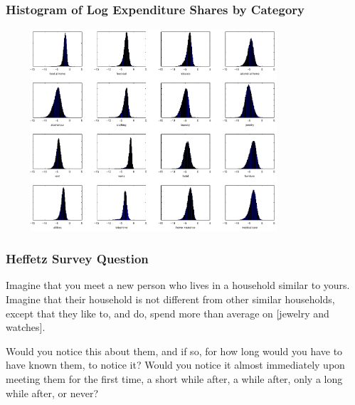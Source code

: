 \documentclass{beamer}
\begin{document}
%
\begin{frame}[label=logn]
  \frametitle{Histogram of Log Expenditure Shares by Category}
  \includegraphics[width=11cm, height=7.5cm]{pics/shrplot_cropped.pdf}

  \hyperlink{comeback}{}
\end{frame}
%
\begin{frame}[label=survq]
  \frametitle{Heffetz Survey Question}
  Imagine that you meet a new person who lives in a household similar to yours. Imagine that their household is not different from other similar households, except that they like to, and do, spend more than average on [jewelry and watches].

  Would you notice this about them, and if so, for how long would you have to have  known them, to notice it? Would you notice it almost immediately upon meeting  them for the first time, a short while after, a while after, only a long while after, or never?

  \hyperlink{hefback}{}
\end{frame}
\end{document}
